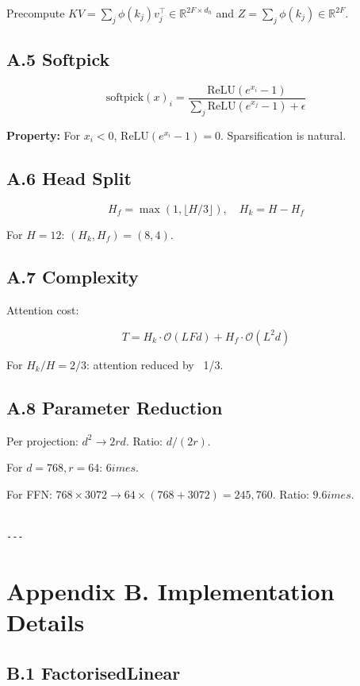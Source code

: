 Precompute $KV = \sum_j \phi(k_j) v_j^\top \in \mathbb{R}^{2F \times d_h}$ 
and $Z = \sum_j \phi(k_j) \in \mathbb{R}^{2F}$.

\subsection{A.5 Softpick}

\[
\text{softpick}(x)_i = \frac{\text{ReLU}(e^{x_i} - 1)}{\sum_j \text{ReLU}(e^{x_j} - 1) + \epsilon}
\]

\textbf{Property:} For $x_i < 0$, $\text{ReLU}(e^{x_i} - 1) = 0$. Sparsification 
is natural.

\subsection{A.6 Head Split}

\[
H_f = \max(1, \lfloor H/3 \rfloor), \quad H_k = H - H_f
\]

For $H = 12$: $(H_k, H_f) = (8, 4)$.

\subsection{A.7 Complexity}

Attention cost:

\[
T = H_k \cdot \mathcal{O}(L F d) + H_f \cdot \mathcal{O}(L^2 d)
\]

For $H_k/H = 2/3$: attention reduced by ~1/3.

\subsection{A.8 Parameter Reduction}

Per projection: $d^2 \to 2rd$. Ratio: $d / (2r)$.

For $d = 768, r = 64$: $6	imes$.

For FFN: $768 \times 3072 \to 64 \times (768 + 3072) = 245,760$. 
Ratio: $9.6	imes$.
\begin{lstlisting}

---
\end{lstlisting}


\section{Appendix B. Implementation Details}

\subsection{B.1 FactorisedLinear}


